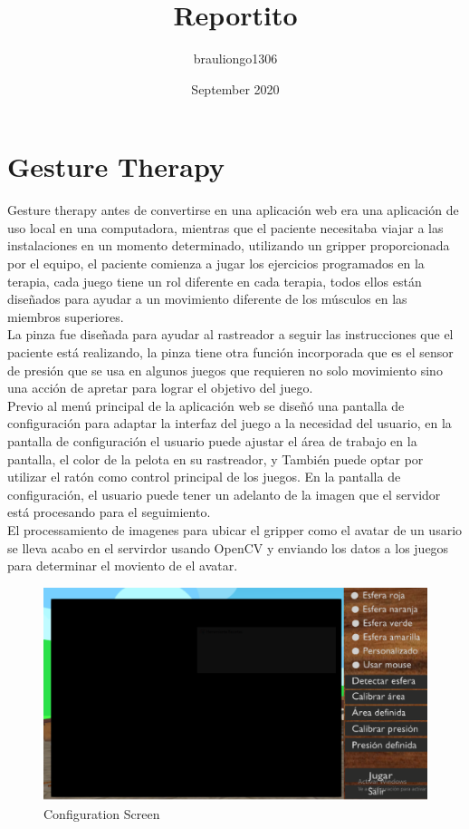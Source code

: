 \documentclass{article}
\title{Reportito}
\author{brauliongo1306}
\date{September 2020}
\begin{document}
\section{Gesture Therapy}
Gesture therapy antes de convertirse en una aplicación web era una aplicación de uso local en una computadora, mientras que el paciente necesitaba viajar a las instalaciones en un momento determinado, utilizando un gripper proporcionada por el equipo, el paciente comienza a jugar los ejercicios programados en la terapia, cada juego tiene un rol diferente en cada terapia, todos ellos están diseñados para ayudar a un movimiento diferente de los músculos en las miembros superiores.
\\
La pinza fue diseñada para ayudar al rastreador a seguir las instrucciones que el paciente está realizando, la pinza tiene otra función incorporada que es el sensor de presión que se usa en algunos juegos que requieren no solo movimiento sino una acción de apretar para lograr el objetivo del juego.
\\
Previo al menú principal de la aplicación web se diseñó una pantalla de configuración para adaptar la interfaz del juego a la necesidad del usuario, en la pantalla de configuración el usuario puede ajustar el área de trabajo en la pantalla, el color de la pelota en su rastreador, y También puede optar por utilizar el ratón como control principal de los juegos. En la pantalla de configuración, el usuario puede tener un adelanto de la imagen que el servidor está procesando para el seguimiento.
\\
El processamiento de imagenes para ubicar el gripper como el avatar de un usario se lleva acabo en el servirdor usando OpenCV y enviando los datos a los juegos para determinar el moviento de el avatar.
\begin{figure}[h]
    \centering
    \includegraphics[scale=.35]{config_screen.PNG}
    \caption{Configuration Screen}
    \label{ConfScreen}
\end{figure}
\end{document}
